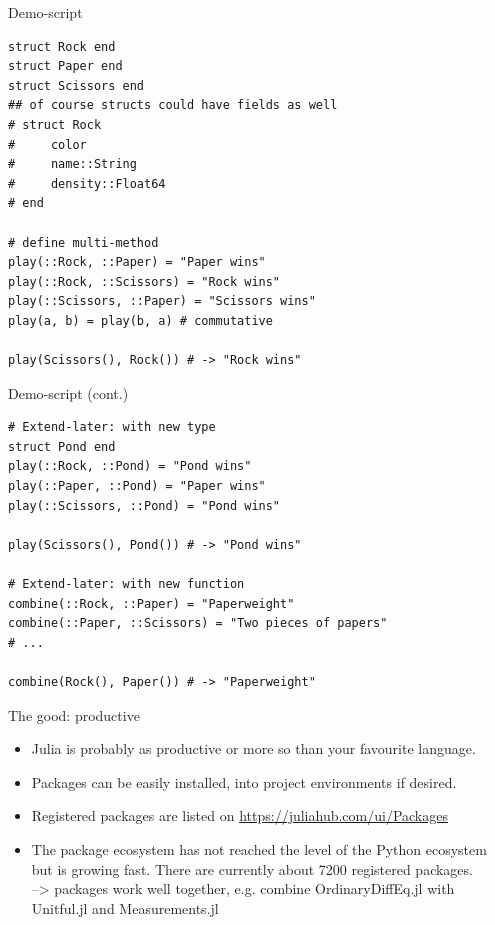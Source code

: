 \documentclass[compress,presentation,aspectratio=169]{beamer}
\begin{document}
\begin{frame}[fragile,label={sec:org7f60950}]{Demo-script}
  \footnotesize
 \begin{verbatim}
struct Rock end
struct Paper end
struct Scissors end
## of course structs could have fields as well
# struct Rock
#     color
#     name::String
#     density::Float64
# end

# define multi-method
play(::Rock, ::Paper) = "Paper wins"
play(::Rock, ::Scissors) = "Rock wins"
play(::Scissors, ::Paper) = "Scissors wins"
play(a, b) = play(b, a) # commutative

play(Scissors(), Rock()) # -> "Rock wins"
\end{verbatim}
\end{frame}

\begin{frame}[fragile,label={sec:org7f60950}]{Demo-script (cont.)}
  \footnotesize
 \begin{verbatim}
# Extend-later: with new type
struct Pond end
play(::Rock, ::Pond) = "Pond wins"
play(::Paper, ::Pond) = "Paper wins"
play(::Scissors, ::Pond) = "Pond wins"

play(Scissors(), Pond()) # -> "Pond wins"

# Extend-later: with new function
combine(::Rock, ::Paper) = "Paperweight"
combine(::Paper, ::Scissors) = "Two pieces of papers"
# ...

combine(Rock(), Paper()) # -> "Paperweight"
\end{verbatim}
\end{frame}

\begin{frame}[label={sec:orgab5838a}]{The good: productive}
  \footnotesize
\begin{itemize}
\item Julia is probably as productive or more so than your favourite language.

\item Packages can be easily installed, into project environments if
desired.

\item Registered packages are listed on \url{https://juliahub.com/ui/Packages}

\item The package ecosystem has not reached the level of the Python
ecosystem but is growing fast.  There are currently about 7200 registered
packages.\\
--> packages work well together, e.g. combine OrdinaryDiffEq.jl with
Unitful.jl and Measurements.jl
\end{itemize}
\end{frame}
\end{document}
